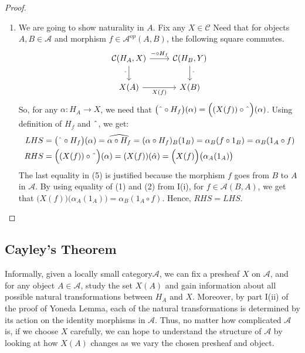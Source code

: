\documentclass[18pt,a4paper]{article}
\theoremstyle{definition}
\begin{document}
\begin{proof}
\begin{enumerate}[label=\Roman*]
\begin{enumerate}[label=(\roman*)]
	\item We are going to show naturality in $A$. Fix any $X \in \mathcal{C} $ Need that
		for objects $A,B \in \mathcal{A} $ and morphism $f\in \mathcal{A} ^{op}(A,B)$,
		the following square commutes.
		\begin{equation*}
		\begin{tikzcd}
			\mathcal{C}(H_A,X) \arrow[swap]{d}{ \string ^}
			\arrow{r}{- \circ H_f}
			& \mathcal{C}(H_B,Y) \arrow{d}{\string ^}\\
			X(A) \arrow[swap]{r}{X(f)}
			& X(B)
		\end{tikzcd}
		\end{equation*}
		So, for any $\alpha:H_A \to X$, we need that
	$\big( \string ^ \circ H_f \big)(\alpha)=\Big((X(f)) \circ \string ^ \Big)(\alpha) $.
	Using definition of $H_f$ and $\string ^$, we get:
	\begin{align}
		LHS&=\big( \string ^ \circ H_f \big)(\alpha)= \widehat{\alpha \circ H_f}
		=(\alpha \circ H_f)_B (1_B) = \alpha_B (f \circ 1_B) = \alpha_B(1_A \circ f) \\
		RHS&=\Big((X(f)) \circ \string ^ \Big)(\alpha)
		= (X(f))(\hat{\alpha})= \Big(X(f) \Big)\big(\alpha_A(1_A)\big)
	\end{align}
	The last equality in (5) is justified because the morphism $f$ goes from $B$ to
	$A$ in $\mathcal{A} $. By using equality of (1) and (2) from I(i), for
	$f \in \mathcal{A}(B,A)$, we get that
	$\Big(X(f) \Big)\big(\alpha_A(1_A)\big)=\alpha_B( 1_A \circ f) $.
	Hence, $RHS=LHS$.
\end{enumerate}
	\end{enumerate}
\end{proof}
\subsection{Cayley's Theorem}%
Informally, given a locally small category$\mathcal{A} $, we can fix a presheaf $X$ on $\mathcal{A}$,
and for any object $A \in \mathcal{A} $, study the set $X(A)$ and gain information
about all possible natural transformations between $H_A$ and $X$. Moreover, by part I(ii) of the
proof of Yoneda Lemma, each of the natural transformations is determined by its action
on the identity morphisms in $\mathcal{A}$. Thus, no matter how complicated $\mathcal{A}$ is, if we choose $X$ carefully, we can hope to understand the structure of $\mathcal{A} $
by looking at how $X(A)$ changes as we vary the chosen
presheaf and object.
\end{document}
